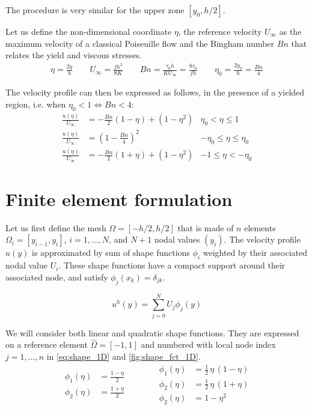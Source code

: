 \documentclass[11 pt]{report}
\begin{document}
The procedure is very similar for the upper zone $[y_0, h/2]$.

Let us define the non-dimensional coordinate $\eta$, the reference velocity $U_{\infty}$ as the maximum velocity of a classical Poiseuille flow and the Bingham number $Bn$ that relates the yield and viscous stresses.
\begin{align}
    \eta=\frac{2y}{h} \qquad U_{\infty}= \frac{f h^2}{8K} \qquad Bn=\frac{\tau_0 h}{K U_{\infty}}=\frac{8\tau_0}{f h} \qquad \eta_0 = \frac{2y_0}{h} = \frac{Bn}{4}
\end{align}

The velocity profile can then be expressed as follows, in the presence of a yielded region, i.e. when $\eta_0 < 1 \iff Bn < 4$:
\begin{align}
    \frac{u(\eta)}{U_{\infty}} &= -\frac{Bn}{2}(1-\eta) + (1-\eta^2) & \eta_0 < \eta \leq 1\\
    \frac{u(\eta)}{U_{\infty}} &= \left(1 - \frac{Bn}{4} \right)^2 & -\eta_0 \leq \eta \leq \eta_0 \\
    \frac{u(\eta)}{U_{\infty}} &= -\frac{Bn}{2}(1+\eta) + (1-\eta^2) & -1 \leq \eta < -\eta_0
\end{align}



\section{Finite element formulation}

Let us first define the mesh $\Omega=[-h/2, h/2]$ that is made of $n$ elements $\Omega_i=[y_{i-1}, y_i]$, $i=1, \dots, N$, and $N+1$ nodal values $(y_i)$. The velocity profile $u(y)$ is approximated by sum of shape functions $\phi_i$ weighted by their associated nodal value $U_i$. These shape functions have a compact support around their associated node, and satisfy $\phi_j(x_k) = \delta_{jk}$.

\begin{equation}
        u^h(y) = \sum_{j=0}^N U_j \phi_j(y)
\end{equation}

We will consider both linear and quadratic shape functions. They are expressed on a reference element $\hat \Omega = [-1, 1]$ and numbered with local node index $j=1,\dots,n$ in \autoref{eq:shape_1D} and \autoref{fig:shape_fct_1D}.
\begin{equation}
    \begin{split}
        \phi_1(\eta) &= \frac{1-\eta}{2}\\
        \phi_2(\eta) &= \frac{1+\eta}{2}\\
    \end{split}
    \hspace{40pt}
    \begin{split}
        \phi_1(\eta) &= \frac{1}{2} \, \eta \, (1-\eta)\\
        \phi_2(\eta) &= \frac{1}{2} \, \eta \, (1+\eta)\\
        \phi_2(\eta) &= 1 - \eta^2\\
    \end{split}
    \label{eq:shape_1D}
\end{equation}
\end{document}
